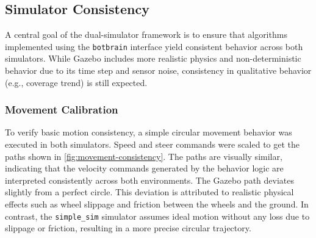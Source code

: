\subsection{Simulator Consistency}
\label{sec:simulator-consistency}
A central goal of the dual-simulator framework is to ensure that algorithms implemented using the \texttt{botbrain} interface yield consistent behavior across both simulators. While Gazebo includes more realistic physics and non-deterministic behavior due to its time step and sensor noise, consistency in qualitative behavior (e.g., coverage trend) is still expected.

\subsubsection{Movement Calibration}
To verify basic motion consistency, a simple circular movement behavior was executed in both simulators. Speed and steer commands were scaled to get the paths shown in \cref{fig:movement-consistency}. The paths are visually similar, indicating that the velocity commands generated by the behavior logic are interpreted consistently across both environments. The Gazebo path deviates slightly from a perfect circle. This deviation is attributed to realistic physical effects such as wheel slippage and friction between the wheels and the ground. In contrast, the \texttt{simple\_sim} simulator assumes ideal motion without any loss due to slippage or friction, resulting in a more precise circular trajectory.

